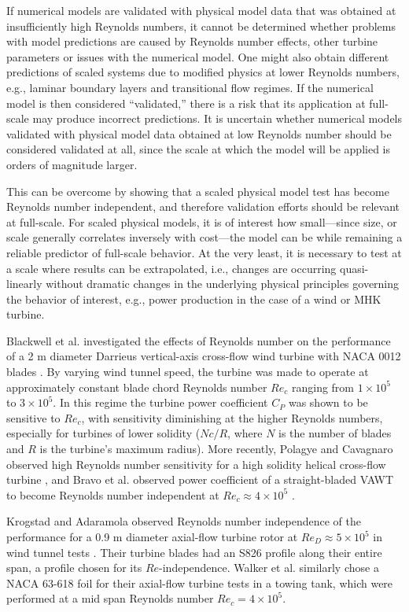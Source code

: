 \documentclass[energies,article,accept,moreauthors,pdftex,12pt,a4paper]{mdpi}
\begin{document}
If numerical models are validated with physical model data that
was obtained at insufficiently high Reynolds numbers, it cannot be determined
whether problems with model predictions are caused by Reynolds number effects,
other turbine parameters or issues with the numerical model.
One might also obtain different predictions of scaled systems
due to modified physics at lower Reynolds numbers, e.g., laminar boundary
layers and transitional flow regimes. If the numerical model is then considered
``validated,'' there is a risk that its application at full-scale may produce
incorrect predictions. It is uncertain whether numerical models validated with
physical model data obtained at low Reynolds number should be considered
validated at all, since the scale at which the model will be applied is orders
of magnitude larger.

This can be overcome by showing that a scaled physical model test has become
Reynolds number independent, and therefore validation efforts should be
relevant at full-scale.  For scaled physical models, it is of interest how
small---since size, or scale generally correlates inversely with cost---the
model can be while remaining a reliable predictor of full-scale behavior. At
the very least, it is necessary to test at a scale where results can be
extrapolated, i.e., changes are occurring quasi-linearly without dramatic
changes in the underlying physical principles governing the behavior of
interest, e.g., power production in the case of a wind or MHK turbine.

Blackwell et al. investigated the effects of Reynolds number on the
performance
of a 2 m diameter Darrieus vertical-axis cross-flow wind turbine with NACA 0012
blades \cite{Blackwell1976}. By varying wind tunnel speed, the turbine was made
to operate at approximately constant blade chord Reynolds number $Re_c$ ranging
from $1 \times 10^5$ to $3 \times 10^5$. In this regime the turbine power
coefficient $C_P$ was shown to be sensitive to $Re_c$, with sensitivity
diminishing at the higher Reynolds numbers, especially for turbines of lower
solidity ($Nc/R$, where $N$ is the number of blades and $R$ is the turbine's
maximum radius). More recently, Polagye and Cavagnaro observed high Reynolds
number sensitivity for a high solidity helical cross-flow turbine
\cite{Polagye2013b}, and Bravo et al. observed power coefficient of a
straight-bladed VAWT to become Reynolds number independent at $Re_c \approx 4
\times 10^5$ \cite{Bravo2007}.

Krogstad and Adaramola observed Reynolds number independence of the performance for a 0.9 m
diameter axial-flow turbine rotor at $Re_D \approx 5 \times 10^5$ in wind tunnel
tests \cite{Krogstad2012a}. Their turbine blades had an S826 profile along their entire span, a profile chosen for its $Re$-independence. Walker et al. \cite{Walker2014} similarly chose a NACA 63-618 foil for their axial-flow turbine tests in a towing tank, which were performed at a mid span Reynolds number $Re_c = 4 \times 10^5$.
\end{document}
